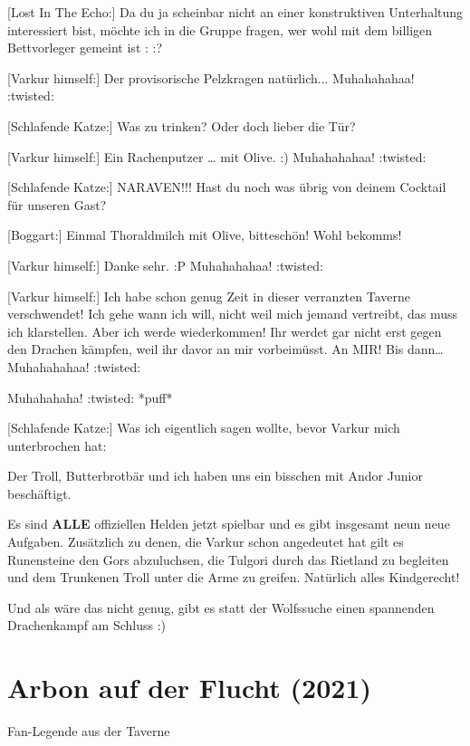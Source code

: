 {[Lost In The Echo:] Da du ja scheinbar nicht an einer konstruktiven Unterhaltung interessiert bist, möchte ich in die Gruppe fragen, wer wohl mit dem billigen Bettvorleger gemeint ist : :?

[Varkur himself:] Der provisorische Pelzkragen natürlich... {\footnotesize Muhahahahaa! :twisted:}

[Schlafende Katze:] Was zu trinken? Oder doch lieber die Tür?

[Varkur himself:] Ein Rachenputzer … mit Olive. :) {\footnotesize Muhahahahaa! :twisted:}

[Schlafende Katze:] NARAVEN!!! Hast du noch was übrig von deinem Cocktail für unseren Gast?

[Boggart:] Einmal Thoraldmilch mit Olive, bitteschön! Wohl bekomms!

[Varkur himself:] Danke sehr. :P {\footnotesize Muhahahahaa! :twisted:}

[Varkur himself:] Ich habe schon genug Zeit in dieser verranzten Taverne verschwendet! Ich gehe wann ich will, nicht weil mich jemand vertreibt, das muss ich klarstellen. Aber ich werde wiederkommen! Ihr werdet gar nicht erst gegen den Drachen kämpfen, weil ihr davor an mir vorbeimüsst. An MIR!
Bis dann… {\footnotesize Muhahahahaa! :twisted:}

Muhahahaha! :twisted: *puff*

[Schlafende Katze:] Was ich eigentlich sagen wollte, bevor Varkur mich unterbrochen hat:

Der Troll, Butterbrotbär und ich haben uns ein bisschen mit Andor Junior beschäftigt.

Es sind \textbf{ALLE} offiziellen Helden jetzt spielbar und es gibt insgesamt neun neue Aufgaben.
Zusätzlich zu denen, die Varkur schon angedeutet hat gilt es Runensteine den Gors abzuluchsen, die Tulgori durch das Rietland zu begleiten und dem Trunkenen Troll unter die Arme zu greifen. Natürlich alles Kindgerecht!

Und als wäre das nicht genug, gibt es statt der Wolfssuche einen spannenden Drachenkampf am Schluss :)




\newpage
{}
\section{Arbon auf der Flucht (2021)}

\begin{center}
    Fan-Legende aus der Taverne


\end{center}}
